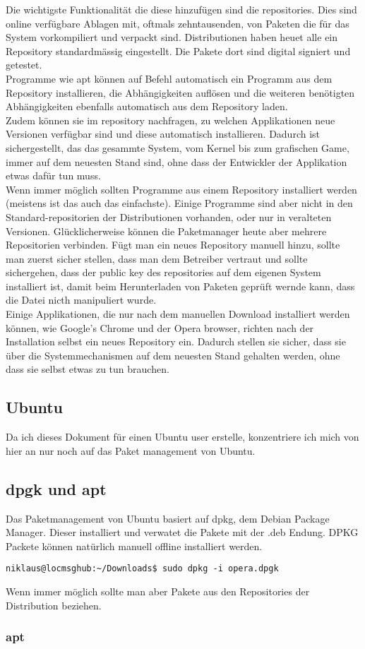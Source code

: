 Die wichtigste Funktionalit\"at die diese hinzuf\"ugen sind die repositories. Dies sind online verf\"ugbare Ablagen mit, oftmals zehntausenden, von Paketen die f\"ur das System vorkompiliert und verpackt sind. Distributionen haben heuet alle ein Repository standardm\"assig eingestellt. Die Pakete dort sind digital signiert und getestet.\\
Programme wie apt k\"onnen auf Befehl automatisch ein Programm aus dem Repository installieren, die Abh\"angigkeiten aufl\"osen und die weiteren ben\"otigten Abh\"angigkeiten ebenfalls automatisch aus dem Repository laden.\\
Zudem k\"onnen sie im repository nachfragen, zu welchen Applikationen neue Versionen verf\"ugbar sind und diese automatisch installieren. Dadurch ist sichergestellt, das das gesammte System, vom Kernel bis zum grafischen Game, immer auf dem neuesten Stand sind, ohne dass der Entwickler der Applikation etwas daf\"ur tun muss.\\
Wenn immer m\"oglich sollten Programme aus einem Repository installiert werden (meistens ist das auch das einfachste). Einige Programme sind aber nicht in den Standard-repositorien der Distributionen vorhanden, oder nur in veralteten Versionen. Gl\"ucklicherweise k\"onnen die Paketmanager heute aber mehrere Repositorien verbinden. F\"ugt man ein neues Repository manuell hinzu, sollte man zuerst sicher stellen, dass man dem Betreiber vertraut und sollte sichergehen, dass der public key des repositories auf dem eigenen System installiert ist, damit beim Herunterladen von Paketen gepr\"uft wernde kann, dass die Datei nicth manipuliert wurde.\\
Einige Applikationen, die nur nach dem manuellen Download installiert werden k\"onnen, wie Google's Chrome und der Opera browser, richten nach der Installation selbst ein neues Repository ein. Dadurch stellen sie sicher, dass sie \"uber die Systemmechanismen auf dem neuesten Stand gehalten werden, ohne dass sie selbst etwas zu tun brauchen.
\subsection{Ubuntu}
Da ich dieses Dokument f\"ur einen Ubuntu user erstelle, konzentriere ich mich von hier an nur noch auf das Paket management von Ubuntu.
\subsection{dpgk und apt}
Das Paketmanagement von Ubuntu basiert auf dpkg, dem Debian Package Manager. Dieser installiert und verwatet die Pakete mit der .deb Endung. DPKG Packete k\"onnen nat\"urlich manuell offline installiert werden.
\begin{lstlisting}
niklaus@locmsghub:~/Downloads$ sudo dpkg -i opera.dpgk
\end{lstlisting}
Wenn immer m\"oglich sollte man aber Pakete aus den Repositories der Distribution beziehen.

\subsubsection{apt}
